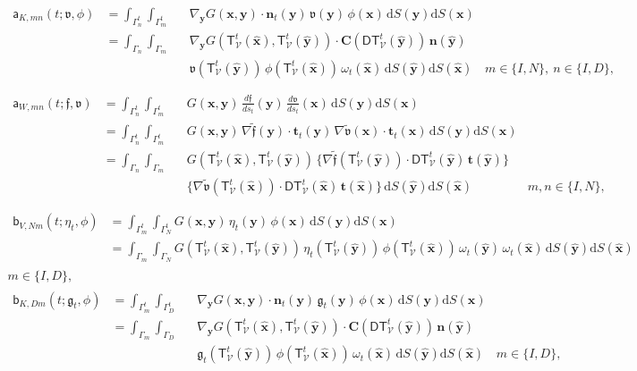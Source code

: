\documentclass{article}
\theoremstyle{remark}
\newcommand{\T}{\mathsf{T}}
\newcommand{\aaa}{\mathsf{a}}
\newcommand{\bbb}{\mathsf{b}}
\newcommand{\x}{\boldsymbol{x}}
\newcommand{\y}{\boldsymbol{y}}
\newcommand{\dd}{\mathrm{d}}
\newcommand{\n}{\boldsymbol{n}}
\newcommand{\tg}{\boldsymbol{t}}
\newcommand{\hatx}{\widehat{\boldsymbol{x}}}
\newcommand{\haty}{\widehat{\boldsymbol{y}}}
\newcommand{\argv}{\mathfrak{v}}
\newcommand{\argf}{\mathfrak{f}}
\newcommand{\argg}{\mathfrak{g}}
\newcommand{\mat}[1]{\mathbf{#1}}
\newcommand{\Nu}{\mathcal{V}}
\newcommand{\Tt}{\T_\Nu^t}
\newcommand{\DTt}{\mathsf{DT}_\Nu^t}
\newcommand{\CDTt}[1]{\mat{C}(\DTt({#1}))}
\newcommand{\ot}{\omega_t}
\begin{document}
\begin{multline*}
    \begin{aligned}
    \aaa_{K,mn}(t;\argv,\phi)
    &=\int_{\Gamma_n^t}\int_{\Gamma_m^t}&&\nabla_{\boldsymbol y}G(\x,\y)\cdot\n_t(\y)\,\argv(\y)\,\phi(\x)\,\dd S(\y)\dd S(\x)&\\
    &=\int_{\Gamma_n}\int_{\Gamma_m}&&\nabla_{\boldsymbol y}G(\Tt(\hatx),\Tt(\haty))\cdot\CDTt{\haty}\,\n(\haty)&\\
    &&&\argv(\Tt(\haty))\,\phi(\Tt(\hatx))\,\ot(\hatx)\,\dd S(\haty)\dd S(\hatx)    &m\in\{I,N\},~n\in\{I,D\},
    \end{aligned}\\
\end{multline*}
\begin{multline*}
    \begin{aligned}
    \aaa_{W,mn}(t;\argf,\argv)
    &=\int_{\Gamma_n^t}\int_{\Gamma_m^t}&&G(\x,\y)\,\frac{d\argf}{ds_t}(\y)\,\frac{d\argv}{ds_t}(\x)\,\dd S(\y)\dd S(\x)&\\
    &=\int_{\Gamma_n^t}\int_{\Gamma_m^t}&&G(\x,\y)\,\nabla\widetilde{\argf}(\y)\cdot\tg_t(\y)\,\nabla\widetilde{\argv}(\x)\cdot\tg_t(\x)\,\dd S(\y)\dd S(\x)&\\
    &=\int_{\Gamma_n}\int_{\Gamma_m}&&G(\Tt(\hatx),\Tt(\haty))\,\{\nabla\widetilde{\argf}(\Tt(\haty))\cdot\DTt(\haty)\,\tg(\haty)\}&\\
    &&&\{\nabla\widetilde{\argv}(\Tt(\hatx))\cdot\DTt(\hatx)\,\tg(\hatx)\}\,\dd S(\haty)\dd S(\hatx)
    &m, n\in\{I,N\},
    \end{aligned}\\
\end{multline*}
\begin{multline*}
    \begin{aligned}
    \bbb_{V,Nm}(t;\eta_t,\phi)
    &=\int_{\Gamma_m^t}\int_{\Gamma_N^t}G(\x,\y)\,\eta_t(\y)\,\phi(\x)\,\dd S(\y)\dd S(\x)&\\
    &=\int_{\Gamma_m}\int_{\Gamma_N}G(\Tt(\hatx),\Tt(\haty))\,\eta_t(\Tt(\haty))\,\phi(\Tt(\hatx))\,\ot(\haty)\,\ot(\hatx)\,\dd S(\haty)\dd S(\hatx)
    \end{aligned}\\
    m\in\{I,D\},
\end{multline*}
\begin{multline*}
    \begin{aligned}
    \bbb_{K,Dm}(t;\argg_t,\phi)
    &=\int_{\Gamma_m^t}\int_{\Gamma_D^t}&&\nabla_{\boldsymbol y}G(\x,\y)\cdot\n_t(\y)\,\argg_t(\y)\,\phi(\x)\,\dd S(\y)\dd S(\x)&\\
    &=\int_{\Gamma_m}\int_{\Gamma_D}&&\nabla_{\boldsymbol y}G(\Tt(\hatx),\Tt(\haty))\cdot\CDTt{\haty}\,\n(\haty)&\\
    &&&\argg_t(\Tt(\haty))\,\phi(\Tt(\hatx))\,\ot(\hatx)\,\dd S(\haty)\dd S(\hatx)
    &m\in\{I,D\},
    \end{aligned}\\
\end{multline*}
\end{document}
